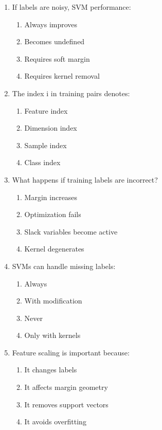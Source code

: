 \documentclass{article}
\begin{document}
\begin{enumerate}
		\item If labels are noisy, SVM performance:
		\begin{enumerate}
			\item Always improves
			\item Becomes undefined
			\item Requires soft margin
			\item Requires kernel removal
		\end{enumerate}
		
		\item The index i in training pairs denotes:
		\begin{enumerate}
			\item Feature index
			\item Dimension index
			\item Sample index
			\item Class index
		\end{enumerate}
		
		\item What happens if training labels are incorrect?
		\begin{enumerate}
			\item Margin increases
			\item Optimization fails
			\item Slack variables become active
			\item Kernel degenerates
		\end{enumerate}
		
		\item SVMs can handle missing labels:
		\begin{enumerate}
			\item Always
			\item With modification
			\item Never
			\item Only with kernels
		\end{enumerate}
		
		\item Feature scaling is important because:
		\begin{enumerate}
			\item It changes labels
			\item It affects margin geometry
			\item It removes support vectors
			\item It avoids overfitting
		\end{enumerate}
	\end{enumerate}
	
\end{document}
